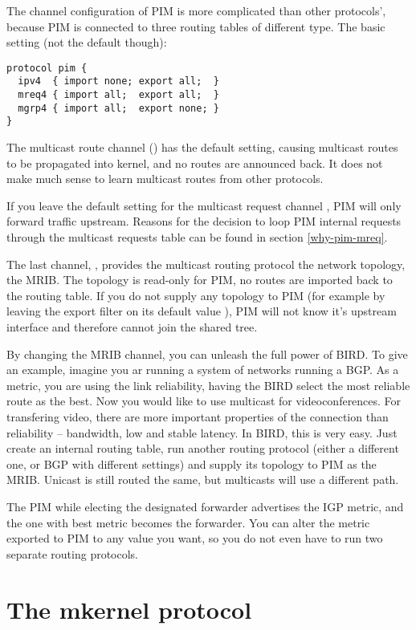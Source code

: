 The channel configuration of PIM is more complicated than other protocols',
because PIM is connected to three routing tables of different type. The basic
setting (not the default though):

\begin{lstlisting}
protocol pim {
  ipv4  { import none; export all;  }
  mreq4 { import all;  export all;  }
  mgrp4 { import all;  export none; }
}
\end{lstlisting}

The multicast route channel () has the default setting, causing
multicast routes to be propagated into kernel, and no routes are announced
back. It does not make much sense to learn multicast routes from other
protocols.

If you leave the default  setting for the multicast request
channel , PIM will only forward traffic upstream. Reasons for the
decision to loop PIM internal requests through the multicast requests table can
be found in section \ref{why-pim-mreq}.

The last channel, , provides the multicast routing protocol the
network topology, the MRIB. The topology is read-only for PIM, no routes are
imported back to the routing table. If you do not supply any topology to PIM
(for example by leaving the export filter on its default value ), PIM
will not know it's upstream interface and therefore cannot join the shared
tree.

By changing the MRIB channel, you can unleash the full power of BIRD. To give
an example, imagine you ar running a system of networks running a BGP. As
a metric, you are using the link reliability, having the BIRD select the most
reliable route as the best. Now you would like to use multicast for
videoconferences. For transfering video, there are more important properties of
the connection than reliability -- bandwidth, low and stable latency. In BIRD,
this is very easy. Just create an internal routing table, run another routing
protocol (either a different one, or BGP with different settings) and supply
its topology to PIM as the MRIB. Unicast is still routed the same, but
multicasts will use a different path.

The PIM while electing the designated forwarder advertises the IGP metric, and
the one with best metric becomes the forwarder. You can alter the metric
exported to PIM to any value you want, so you do not even have to run two
separate routing protocols.

\section{The mkernel protocol}

